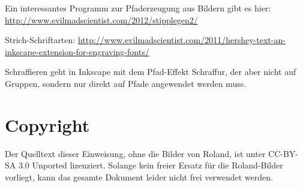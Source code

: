 \documentclass{\basedir/fablab-document}
\begin{document}
Ein interessantes Programm zur Pfaderzeugung aus Bildern gibt es hier: \url{http://www.evilmadscientist.com/2012/stipplegen2/}

Strich-Schriftarten: \url{http://www.evilmadscientist.com/2011/hershey-text-an-inkscape-extension-for-engraving-fonts/}

Schraffieren geht in Inkscape mit dem Pfad-Effekt Schraffur, der aber nicht auf Gruppen, sondern nur direkt auf Pfade angewendet werden muss.

\listoftodos

\newpage
\appendix
\section{Copyright}
Der Quelltext dieser Einweisung, ohne die Bilder von Roland, ist unter CC-BY-SA 3.0 Unported lizenziert. Solange kein freier Ersatz für die Roland-Bilder vorliegt, kann das gesamte Dokument leider nicht frei verwendet werden.
\end{document}
